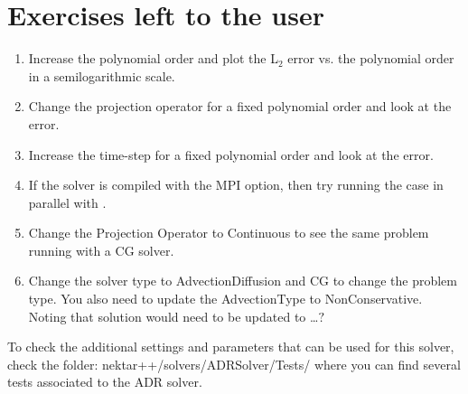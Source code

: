 \section{Exercises left to the user}
\begin{enumerate}
\item Increase the polynomial order and plot the L$_{2}$ error vs. the polynomial order 
in a semilogarithmic scale.
\item Change the projection operator for a fixed polynomial order and look at the error.
\item Increase the time-step for a fixed polynomial order and look at the error.
\item If the solver is compiled with the MPI option, then try running the case in parallel 
with .
\item Change the Projection Operator to Continuous to see the same problem running 
with a CG solver.
\item Change the solver type to AdvectionDiffusion and CG to change
  the problem type.  You also need to update the AdvectionType to
  NonConservative.  Noting that solution would need to be updated to
  \dots $?$
\end{enumerate}

\begin{tipbox}
To check the additional settings and parameters that can be used for this solver,
check the folder: \textsf{nektar++/solvers/ADRSolver/Tests/}
where you can find several tests associated to the ADR solver.
\end{tipbox}


